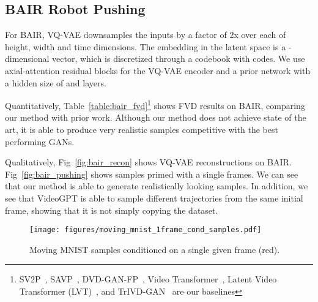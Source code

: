 \documentclass{article}
\begin{document}
\subsection{BAIR Robot Pushing}

For BAIR, VQ-VAE downsamples the inputs by a factor of 2x over each of height, width and time dimensions. The embedding in the latent space is a -dimensional vector, which is discretized through a codebook with  codes. We use  axial-attention residual blocks for the VQ-VAE encoder and a prior network with a hidden size of  and  layers.

Quantitatively, Table~\ref{table:bair_fvd}\footnote{SV2P~\citep{babaeizadeh2017stochastic}, SAVP~\citep{lee2018stochastic}, DVD-GAN-FP~\citep{clark2019adversarial}, Video Transformer~\citep{weissenborn2019scaling}, Latent Video Transformer (LVT)~\citep{rakhimov2020latent}, and TrIVD-GAN~\citep{luc2020transformation} are our baselines} shows FVD results on BAIR, comparing our method with prior work. Although our method does not achieve state of the art, it is able to produce very realistic samples competitive with the best performing GANs.

Qualitatively, Fig~\ref{fig:bair_recon} shows VQ-VAE reconstructions on BAIR. Fig~\ref{fig:bair_pushing} shows samples primed with a single frames. We can see that our method is able to generate realistically looking samples. In addition, we see that VideoGPT is able to sample different trajectories from the same initial frame, showing that it is not simply copying the dataset.  

\begin{figure*}[h]
    \centering
    \texttt{[image: figures/moving\_mnist\_1frame\_cond\_samples.pdf]}
    \caption{Moving MNIST samples conditioned on a single given frame (red). }
    \label{fig:moving_mnist}
\end{figure*}
\end{document}

